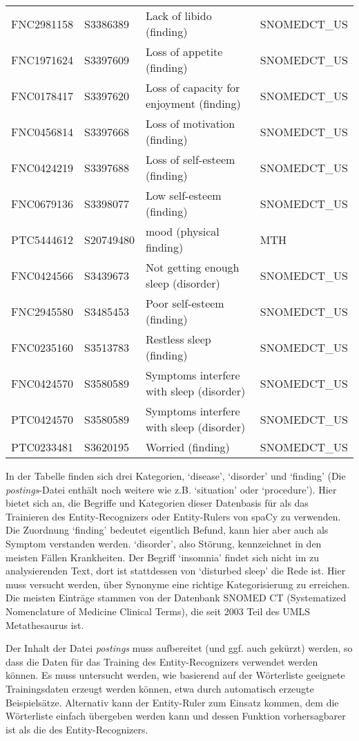 \begin{center}
\begin{tabular}{llll}
FNC2981158 &	S3386389 &	Lack of libido (finding) & SNOMEDCT\_US \\
FNC1971624 &	S3397609 &	Loss of appetite (finding) & SNOMEDCT\_US \\
FNC0178417 &	S3397620 &	\parbox[t]{5cm}{Loss of capacity for enjoyment (finding)} & SNOMEDCT\_US \\
FNC0456814 &	S3397668 &	Loss of motivation (finding)  & SNOMEDCT\_US \\
FNC0424219 &	S3397688 &	Loss of self-esteem (finding) & SNOMEDCT\_US \\
FNC0679136 &	S3398077 &	Low self-esteem (finding) & SNOMEDCT\_US \\
PTC5444612 &	S20749480 & mood (physical finding) & MTH \\
FNC0424566 &	S3439673 &	\parbox[t]{5cm}{Not getting enough sleep (disorder)} &	SNOMEDCT\_US \\
FNC2945580 &	S3485453 &	Poor self-esteem (finding) &	SNOMEDCT\_US \\
FNC0235160 &	S3513783 &	Restless sleep (finding) & SNOMEDCT\_US \\
FNC0424570 &	S3580589 &	\parbox[t]{5cm}{Symptoms interfere with sleep (disorder)} & SNOMEDCT\_US \\
PTC0424570 &	S3580589 &	\parbox[t]{5cm}{Symptoms interfere with sleep (disorder)} & SNOMEDCT\_US \\
PTC0233481 &	S3620195 &	Worried (finding) & SNOMEDCT\_US \\
\hline
\end{tabular}
\end{center}

In der Tabelle finden sich drei Kategorien, `disease', `disorder' und `finding' (Die \emph{postings}-Datei enthält noch weitere wie z.B. `situation' oder `procedure'). Hier bietet sich an, die Begriffe und Kategorien dieser Datenbasis für als das Trainieren des Entity-Recognizers oder Entity-Rulers von spaCy zu verwenden. Die Zuordnung `finding' bedeutet eigentlich Befund, kann hier aber auch als Symptom verstanden werden. `disorder', also Störung, kennzeichnet in den meisten Fällen Krankheiten. Der Begriff `insomnia' findet sich nicht im zu analysierenden Text, dort ist stattdessen von `disturbed sleep' die Rede ist. Hier muss versucht werden, über Synonyme eine richtige Kategorisierung zu erreichen. Die meisten Einträge stammen von der Datenbank SNOMED CT (Systematized Nomenclature of Medicine Clinical Terms), die seit 2003 Teil des UMLS Metathesaurus ist. 

Der Inhalt der Datei \emph{postings} muss aufbereitet (und ggf. auch gekürzt) werden, so dass die Daten für das Training des Entity-Recognizers verwendet werden können. Es muss untersucht werden, wie basierend auf der Wörterliste geeignete Trainingsdaten erzeugt werden können, etwa durch automatisch erzeugte Beispielsätze. Alternativ kann der Entity-Ruler zum Einsatz kommen, dem die Wörterliste einfach übergeben werden kann und dessen Funktion vorhersagbarer ist als die des Entity-Recognizers.

